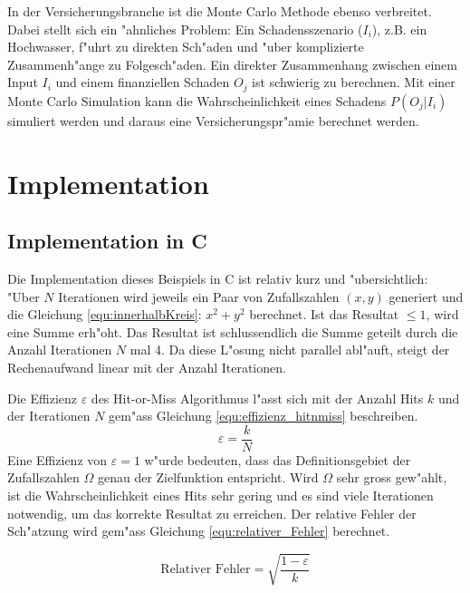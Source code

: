 \begin{refsection}
In der Versicherungsbranche ist die Monte Carlo Methode ebenso
verbreitet. Dabei stellt sich ein "ahnliches Problem: Ein Schadensszenario
($I_i$), z.B. ein Hochwasser, f"uhrt zu direkten Sch"aden und "uber
komplizierte Zusammenh"ange zu Folgesch"aden. Ein direkter Zusammenhang
zwischen einem Input $I_i$ und einem finanziellen Schaden $O_j$ ist
schwierig zu berechnen. Mit einer Monte Carlo Simulation kann die
Wahrscheinlichkeit eines Schadens $P(O_j | I_i)$ simuliert werden und
daraus eine Versicherungspr"amie berechnet werden.



\section{Implementation}
\subsection{Implementation in C}
Die Implementation dieses Beispiels in C ist relativ kurz und
"ubersichtlich: "Uber $N$ Iterationen wird jeweils ein Paar von
Zufallszahlen $(x,y)$ generiert und die Gleichung
\ref{equ:innerhalbKreis}: $x^2 + y^2$ berechnet. Ist das Resultat $\leq1$,
wird eine Summe erh"oht. Das Resultat ist schlussendlich die Summe geteilt
durch die Anzahl Iterationen $N$ mal 4. Da diese L"osung nicht parallel
abl"auft, steigt der Rechenaufwand linear mit der Anzahl Iterationen.

Die Effizienz $\varepsilon$ des Hit-or-Miss Algorithmus l"asst sich
mit der Anzahl Hits $k$ und der Iterationen $N$ gem"ass Gleichung
\ref{equ:effizienz_hitnmiss} beschreiben.
\begin{equation}
	\varepsilon = \frac{k}{N}
	\label{equ:effizienz_hitnmiss}
\end{equation} 
Eine Effizienz von $\varepsilon=1$ w"urde bedeuten, dass das
Definitionsgebiet der Zufallszahlen $\Omega$ genau der Zielfunktion
entspricht. Wird $\Omega$ sehr gross gew"ahlt, ist die Wahrscheinlichkeit
eines Hits sehr gering und es sind viele Iterationen notwendig, um das
korrekte Resultat zu erreichen. Der relative Fehler der Sch"atzung wird
gem"ass Gleichung \ref{equ:relativer_Fehler} berechnet.

\begin{equation}
	\text{Relativer Fehler} = \sqrt{\frac{1-\varepsilon}{k}} 
	\label{equ:relativer_Fehler}
\end{equation}


\end{refsection}
